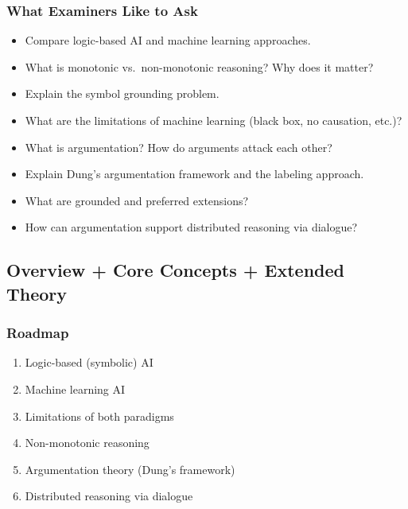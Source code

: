 \separator

\subsubsection*{What Examiners Like to Ask}

\begin{itemize}
  \item Compare logic-based AI and machine learning approaches.
  \item What is monotonic vs.\ non-monotonic reasoning? Why does it matter?
  \item Explain the symbol grounding problem.
  \item What are the limitations of machine learning (black box, no causation, etc.)?
  \item What is argumentation? How do arguments attack each other?
  \item Explain Dung's argumentation framework and the labeling approach.
  \item What are grounded and preferred extensions?
  \item How can argumentation support distributed reasoning via dialogue?
\end{itemize}

\bigseparator

\subsection{Overview + Core Concepts + Extended Theory}

\subsubsection*{Roadmap}
\begin{enumerate}
  \item Logic-based (symbolic) AI
  \item Machine learning AI
  \item Limitations of both paradigms
  \item Non-monotonic reasoning
  \item Argumentation theory (Dung's framework)
  \item Distributed reasoning via dialogue
\end{enumerate}

